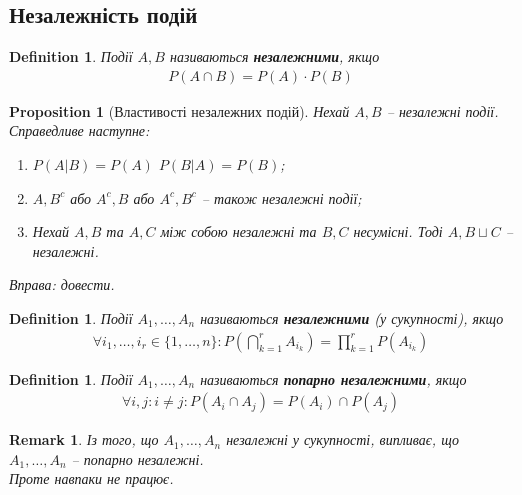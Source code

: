 \documentclass[a4paper, 10pt]{article}
\theoremstyle{theoremdd}
\newtheorem{definition}[theorem]{Definition}
\newtheorem{proposition}[theorem]{Proposition}
\newtheorem{remark}[theorem]{Remark}
\begin{document}
\subsection{Незалежність подій}
\begin{definition}
Події $A,B$ називаються \textbf{незалежними}, якщо
\begin{align*}
P(A \cap B) = P(A) \cdot P(B)
\end{align*}
\end{definition}

\begin{proposition}[Властивості незалежних подій]
Нехай $A,B$ -- незалежні події. Справедливе наступне:
\begin{enumerate}[nosep,wide=0pt,label={\arabic*)}]
\item $P(A|B) = P(A)$ \qquad $P(B|A) = P(B)$;
\item $A,B^c$ або $A^c,B$ або $A^c,B^c$ -- також незалежні події;
\item Нехай $A,B$ та $A,C$ між собою незалежні та $B,C$ несумісні. Тоді $A, B \sqcup C$ -- незалежні.
\end{enumerate}
\textit{Вправа: довести.}
\end{proposition}

\begin{definition}
Події $A_1,\dots,A_n$ називаються \textbf{незалежними} (у сукупності), якщо
\begin{align*}
\forall i_1,\dots,i_r \in \{1,\dots,n\}: P\left( \bigcap_{k=1}^r A_{i_k} \right) = \prod_{k=1}^r P(A_{i_k})
\end{align*}
\end{definition}

\begin{definition}
Події $A_1,\dots,A_n$ називаються \textbf{попарно незалежними}, якщо
\begin{align*}
\forall i,j: i \neq j: P(A_i \cap A_j) = P(A_i) \cap P(A_j)
\end{align*}
\end{definition}

\begin{remark}
Із того, що $A_1,\dots,A_n$ незалежні у сукупності, випливає, що $A_1,\dots,A_n$ -- попарно незалежні.\\
Проте навпаки не працює.
\end{remark}
\end{document}
